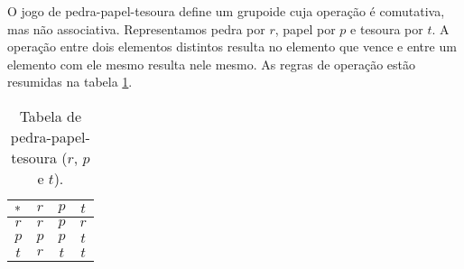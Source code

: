 \begin{example}
O jogo de pedra-papel-tesoura define um grupoide cuja operação é comutativa, mas não associativa. Representamos pedra por $r$, papel por $p$ e tesoura por $t$. A operação entre dois elementos distintos resulta no elemento que vence e entre um elemento com ele mesmo resulta nele mesmo. As regras de operação estão resumidas na tabela \ref{tab:operacao.pedrapapeltesousa}. 
\end{example}

\begin{table}
	\centering

	\begin{tabular}{c | c c c}
	\toprule
	$\ast$	&	$r$	&	$p$	&	$t$ \\
	\hline
	$r$		&	$r$	&	$p$	&	$r$ \\
	$p$		&	$p$	&	$p$	&	$t$ \\
	$t$		&	$r$	&	$t$	&	$t$ \\
	\bottomrule
	\end{tabular}
%

	\caption{Tabela de pedra-papel-tesoura ($r$, $p$ e $t$).}
	\label{tab:operacao.pedrapapeltesousa}
\end{table}

\begin{comment}

\begin{table}
	\centering

	\begin{tabular}{c | c c c c c}
	$\opb$	&	$r$	&	$p$	&	$t$	&	$s$	&	$l$ \\
	\hline
	$r$		&	$r$	&	$p$	&	$r$	&	$?$	&	$?$ \\
	$p$		&	$p$	&	$p$	&	$t$	&	$?$	&	$?$ \\
	$t$		&	$r$	&	$t$	&	$t$	&	$?$	&	$?$ \\
	$s$		&	$?$	&	$?$	&	$?$	&	$?$	&	$?$ \\
	$l$		&	$?$	&	$?$	&	$?$	&	$?$	&	$?$ \\
	\end{tabular}
%

	\caption{Tabela de pedra-papel-tesoura-Spock-lagarto ($r$, $p$ e $t$).}
	\label{tab:operacao.pedrapapeltesousa}
\end{table}

\end{comment}

